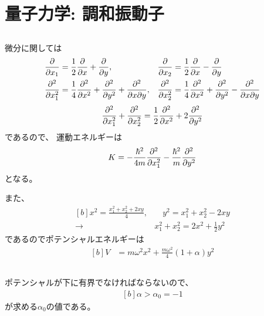 \documentclass[../../sp_2016.tex]{subfiles}
\begin{document}
\section{量子力学: 調和振動子}
\subsection{}
微分に関しては
\begin{equation*}\begin{aligned}[b]
    \pdv{x_1} &= \frac{1}{2}\pdv{x}+\pdv{y},&
    \pdv{x_2}&=\frac{1}{2}\pdv{x}-\pdv{y}\\
    \pdv[2]{x_1} &= \frac{1}{4}\pdv[2]{x}+\pdv[2]{y}+\frac{\partial^2}{\partial x\partial y},&
    \pdv[2]{x_2} &= \frac{1}{4}\pdv[2]{x}+\pdv[2]{y}-\frac{\partial^2}{\partial x\partial y}\\
\end{aligned}\end{equation*}
\begin{equation}\begin{aligned}[b]
    \pdv[2]{x_1}+\pdv[2]{x_2} = \frac{1}{2}\pdv[2]{x}+2\pdv[2]{y}
\end{aligned}\end{equation}
であるので、
運動エネルギーは
\begin{equation}\begin{aligned}[b]
    K = -\frac{\hbar^2}{4m}\pdv[2]{x_1}-\frac{\hbar^2}{m}\pdv[2]{y}
\end{aligned}\end{equation}
となる。

また、
\begin{equation}\begin{aligned}[b]
    x^2=\frac{x_1^2+x_2^2+2xy}{4},&\quad y^2 =x_1^2+x_2^2-2xy\\
    \rightarrow\quad& x_1^2+x_2^2 = 2x^2+\frac{1}{2}y^2
\end{aligned}\end{equation}
であるのでポテンシャルエネルギーは
\begin{equation}\begin{aligned}[b]
    V &= m\omega^2 x^2 + \frac{m\omega^2}{4}(1+\alpha)y^2
\end{aligned}\end{equation}

\subsection{}
ポテンシャルが下に有界でなければならないので、
\begin{equation}\begin{aligned}[b]
    \alpha > \alpha_0 = -1
\end{aligned}\end{equation}
が求める\(\alpha_0\)の値である。
\end{document}
